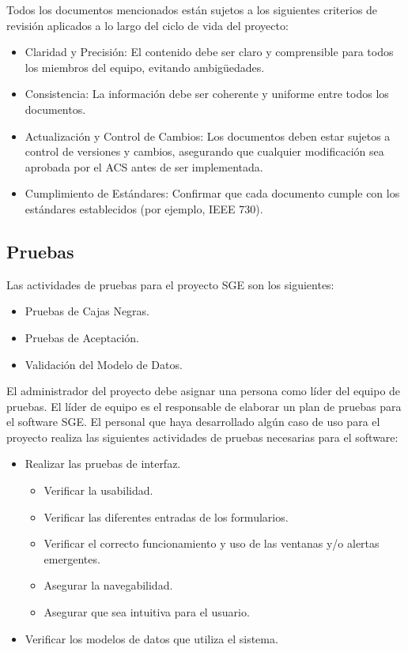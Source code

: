 \documentclass[a4paper,10pt]{article}
\begin{document}
	Todos los documentos mencionados están sujetos a los siguientes criterios de revisión aplicados a lo largo del ciclo de vida del proyecto:
	\begin{itemize}
		\item Claridad y Precisión: El contenido debe ser claro y comprensible para todos los miembros del equipo, evitando ambigüedades.
		\item Consistencia: La información debe ser coherente y uniforme entre todos los documentos.
		\item Actualización y Control de Cambios: Los documentos deben estar sujetos a control de versiones y cambios, asegurando que cualquier modificación sea aprobada por el ACS antes de ser implementada.
		\item Cumplimiento de Estándares: Confirmar que cada documento cumple con los estándares establecidos (por ejemplo, IEEE 730).
	\end{itemize}
	
	\subsection{Pruebas}
	Las actividades de pruebas para el proyecto SGE son los siguientes:
	\begin{itemize}
		\item Pruebas de Cajas Negras.
		\item Pruebas de Aceptación.
		\item Validación del Modelo de Datos.
	\end{itemize}
	
	El administrador del proyecto debe asignar una persona como líder del equipo de pruebas. El líder de equipo es el responsable de elaborar un plan de pruebas para el software SGE. El personal que haya desarrollado algún caso de uso para el proyecto realiza las siguientes actividades de pruebas necesarias para el software:
	
	\begin{itemize}
		\item Realizar las pruebas de interfaz.
		\begin{itemize}
			\item Verificar la usabilidad.
			\item Verificar las diferentes entradas de los formularios.
			\item Verificar el correcto funcionamiento y uso de las ventanas y/o alertas emergentes.
			\item Asegurar la navegabilidad.
			\item Asegurar que sea intuitiva para el usuario.
		\end{itemize}
		\item Verificar los modelos de datos que utiliza el sistema.
	\end{itemize}
	
\end{document}
